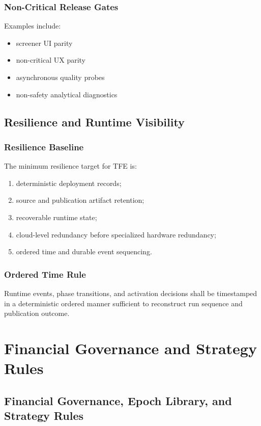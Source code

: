 \documentclass[11pt]{report}
\begin{document}
\section{Non-Critical Release Gates}
Examples include:
\begin{itemize}
    \item screener UI parity
    \item non-critical UX parity
    \item asynchronous quality probes
    \item non-safety analytical diagnostics
\end{itemize}
\chapter{Resilience and Runtime Visibility}
\section{Resilience Baseline}
The minimum resilience target for TFE is:
\begin{enumerate}[leftmargin=1.2cm]
    \item deterministic deployment records;
    \item source and publication artifact retention;
    \item recoverable runtime state;
    \item cloud-level redundancy before specialized hardware redundancy;
    \item ordered time and durable event sequencing.
\end{enumerate}

\section{Ordered Time Rule}
Runtime events, phase transitions, and activation decisions shall be timestamped in a deterministic ordered manner sufficient to reconstruct run sequence and publication outcome.

\part{Financial Governance and Strategy Rules}

\chapter{Financial Governance, Epoch Library, and Strategy Rules}
\end{document}
